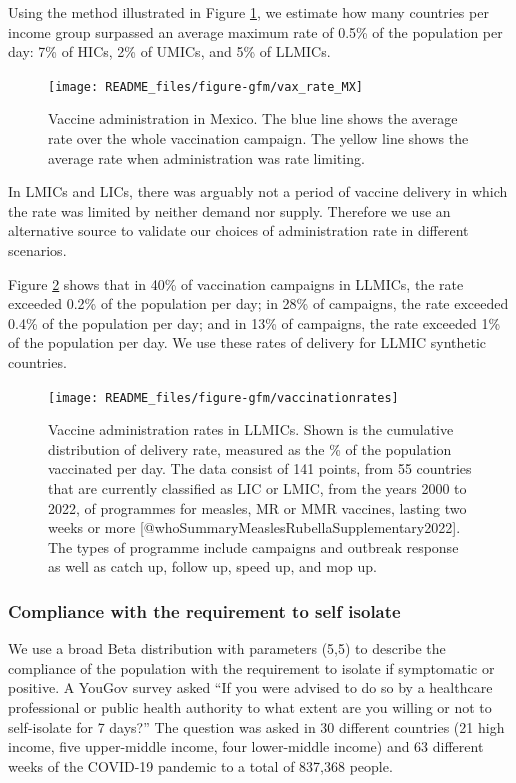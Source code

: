 \documentclass[
]{article}
\begin{document}
Using the method illustrated in Figure \ref{fig:vaxratemx}, we estimate how many countries per income group surpassed an average maximum rate of 0.5\% of the population per day: 7\% of HICs, 2\% of UMICs, and 5\% of LLMICs.

\begin{figure}
\texttt{[image: README\_files/figure-gfm/vax\_rate\_MX]} \caption{Vaccine administration in Mexico. The blue line shows the average rate over the whole vaccination campaign. The yellow line shows the average rate when administration was rate limiting.}\label{fig:vaxratemx}
\end{figure}

In LMICs and LICs, there was arguably not a period of vaccine delivery in which the rate was limited by neither demand nor supply. Therefore we use an alternative source to validate our choices of administration rate in different scenarios.

Figure \ref{fig:vaxratewho} shows that in 40\% of vaccination campaigns in LLMICs, the rate exceeded 0.2\% of the population per day; in 28\% of campaigns, the rate exceeded 0.4\% of the population per day; and in 13\% of campaigns, the rate exceeded 1\% of the population per day. We use these rates of delivery for LLMIC synthetic countries.

\begin{figure}
\texttt{[image: README\_files/figure-gfm/vaccinationrates]} \caption{Vaccine administration rates in LLMICs. Shown is the cumulative distribution of delivery rate, measured as the \% of the population vaccinated per day. The data consist of 141 points, from 55 countries that are currently classified as LIC or LMIC, from the years 2000 to 2022, of programmes for measles, MR or MMR vaccines, lasting two weeks or more [@whoSummaryMeaslesRubellaSupplementary2022]. The types of programme include campaigns and outbreak response as well as catch up, follow up, speed up, and mop up.}\label{fig:vaxratewho}
\end{figure}

\subsubsection{Compliance with the requirement to self isolate}\label{compliance-with-the-requirement-to-self-isolate}

We use a broad Beta distribution with parameters (5,5) to describe the compliance of the population with the requirement to isolate if symptomatic or positive. A YouGov survey \citep{jonessarahpImperialCollegeLondon2020} asked ``If you were advised to do so by a healthcare professional or public health authority to what extent are you willing or not to self-isolate for 7 days?'' The question was asked in 30 different countries (21 high income, five upper-middle income, four lower-middle income) and 63 different weeks of the COVID-19 pandemic to a total of 837,368 people.
\end{document}
